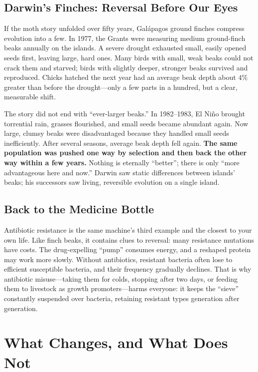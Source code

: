 \subsection{Darwin's Finches: Reversal Before Our Eyes}

If the moth story unfolded over fifty years, Galápagos ground finches compress evolution into a few. In 1977, the Grants were measuring medium ground-finch beaks annually on the islands. A severe drought exhausted small, easily opened seeds first, leaving large, hard ones. Many birds with small, weak beaks could not crack them and starved; birds with slightly deeper, stronger beaks survived and reproduced. Chicks hatched the next year had an average beak depth about $4\%$ greater than before the drought---only a few parts in a hundred, but a clear, measurable shift.

The story did not end with ``ever-larger beaks.'' In 1982--1983, El Niño brought torrential rain, grasses flourished, and small seeds became abundant again. Now large, clumsy beaks were disadvantaged because they handled small seeds inefficiently. After several seasons, average beak depth fell again. \textbf{The same population was pushed one way by selection and then back the other way within a few years.} Nothing is eternally ``better''; there is only ``more advantageous here and now.'' Darwin saw static differences between islands' beaks; his successors saw living, reversible evolution on a single island.

\subsection{Back to the Medicine Bottle}

Antibiotic resistance is the same machine's third example and the closest to your own life. Like finch beaks, it contains clues to reversal: many resistance mutations have costs. The drug-expelling ``pump'' consumes energy, and a reshaped protein may work more slowly. Without antibiotics, resistant bacteria often lose to efficient susceptible bacteria, and their frequency gradually declines. That is why antibiotic misuse---taking them for colds, stopping after two days, or feeding them to livestock as growth promoters---harms everyone: it keeps the ``sieve'' constantly suspended over bacteria, retaining resistant types generation after generation.

\section{What Changes, and What Does Not}

